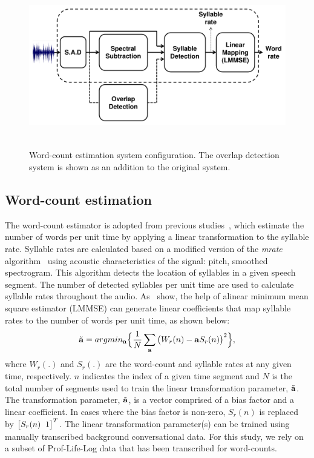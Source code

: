\begin{figure}[t!]
	\centering
	\includegraphics[height = 2.8in, width=1\textwidth]{figures/wce_ovl_SLT2014_systemconfig_figur-crop}
	\vspace{-3mm}
	\caption{Word-count estimation system configuration. The overlap detection system is shown as an addition to the original system.}
	\label{fig:ch6_wce_system_overview}
\end{figure}

\subsection{Word-count estimation}
\label{sec:wce}
The word-count estimator is adopted from previous studies~\cite{IS14_wce}, which estimate the number of words per unit time by applying a linear transformation to the syllable rate. 
Syllable rates are calculated based on a modified version of the {\it mrate} algorithm~\cite{Wang_slbl} using acoustic characteristics of the signal: pitch, smoothed spectrogram. 
This algorithm detects the location of syllables in a given speech segment. 
The number of detected syllables per unit time are used to calculate syllable rates throughout the audio. 
As~\cite{IS14_wce} show, the help of alinear minimum mean square estimator (LMMSE) can generate linear coefficients that map syllable rates to the number of words per unit time, as shown below: 
\begin{equation}
\label{eq:lmmse_wce}
{\tilde {\bf a}} = argmin_{\bf a} \Big\{\frac{1}{N}\sum_{\bf a}\big(W_r(n)-{\bf a}S_r(n)\big)^2\Big\},
\vspace{-1mm}
\end{equation}
where $W_r(.)$ and $S_r(.)$ are the word-count and syllable rates at any given time, respectively. 
$n$ indicates the index of a given time segment and $N$ is the total number of segments used to train the linear transformation parameter, ${\tilde {\bf a}}$. 
The transformation parameter, ${\tilde {\bf a}}$, is a vector comprised of a bias factor and a linear coefficient. 
In cases where the bias factor is non-zero, $S_r(n)$ is replaced by $\big[S_r(n) \hspace{2mm} 1\big]^T$. 
The linear transformation parameter(s) can be trained using manually transcribed background conversational data. 
For this study, we rely on a subset of Prof-Life-Log data that has been transcribed for word-counts. 

